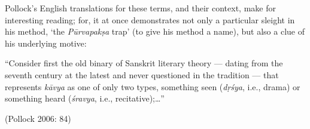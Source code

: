 Pollock’s English translations for these terms, and their context, make for interesting reading; for, it at once demonstrates not only a particular sleight in his method, ‘the \textit{Pūrvapakṣa} trap’ (to give his method a name), but also a clue of his underlying motive:

\begin{myquote}
“Consider first the old binary of Sanskrit literary theory — dating from the seventh century at the latest and never questioned in the tradition — that represents \textit{kāvya} as one of only two types, something seen (\textit{dṛśya}, i.e., drama) or something heard (\textit{śravya}, i.e., recitative);…”
\end{myquote}

\hfill (Pollock 2006: 84)

